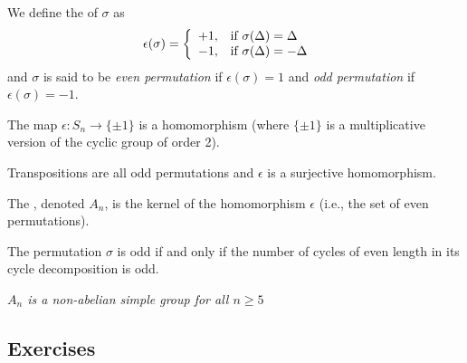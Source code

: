 \documentclass[10pt,a4paper]{report}
\begin{document}
\begin{definition} We define the  of $\sigma$ as
\begin{align*}
	\epsilon(\sigma) &= \left \{ \begin{array}{ll}
		+1, & \text{if } \sigma(\Delta) = \Delta \\
		-1, & \text{if } \sigma(\Delta) = -\Delta
	\end{array}
	 \right .
\end{align*}and $\sigma$ is said to be \textit{even permutation} if $\epsilon(\sigma) = 1$ and \textit{odd permutation} if $\epsilon(\sigma) = -1$.
\end{definition}

\begin{prop}  The map $\epsilon : S_n \to \{\pm 1\}$ is a homomorphism (where $\{\pm 1\}$ is a multiplicative version of the cyclic group of order 2).
\end{prop}

\begin{prop}  Transpositions are all odd permutations and $\epsilon$ is a surjective homomorphism.
\end{prop}

\begin{definition}  The , denoted $A_n$, is the kernel of the homomorphism $\epsilon$ (i.e., the set of even permutations).
\end{definition}

\begin{prop}The permutation $\sigma$ is odd if and only if the number of cycles of even length in its cycle decomposition is odd.
\end{prop}

\begin{center}
\textit{$A_n$ is a non-abelian simple group for all $n \ge 5$}
\end{center}

\subsection{Exercises}
\end{document}
